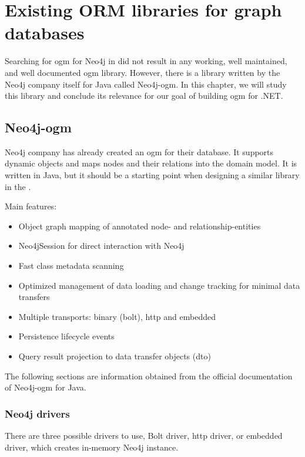 \chapter {Existing ORM libraries for graph databases}

Searching for \acrshort{ogm} for Neo4j in \CS did not result in any working, well maintained, and well documented \acrshort{ogm} library.
However, there is a library written by the Neo4j company itself for Java called Neo4j-\acrshort{ogm}. In this chapter, we will study this library
and conclude its relevance for our goal of building \acrshort{ogm} for .NET.

\section{Neo4j-\acrshort{ogm}}

Neo4j company has already created an \acrshort{ogm} for their database. It supports dynamic objects and maps nodes and their relations into the domain model.
It is written in Java, but it should be a starting point when designing a similar library in the \CS.

\noindent Main features:
\begin{itemize}
    \item Object graph mapping of annotated node- and relationship-entities
    \item Neo4jSession for direct interaction with Neo4j
    \item Fast class metadata scanning
    \item Optimized management of data loading and change tracking for minimal data transfers
    \item Multiple transports: binary (bolt), \acrshort{http} and embedded
    \item Persistence lifecycle events
    \item Query result projection to data transfer objects (\acrshort{dto})
\end{itemize}

The following sections are information obtained from the official documentation of Neo4j-\acrshort{ogm} for Java. \cite{noauthor_reference_nodate}

\subsection {Neo4j drivers}

There are three possible drivers to use, Bolt driver, \acrshort{http} driver, or embedded driver, which creates in-memory Neo4j instance.

